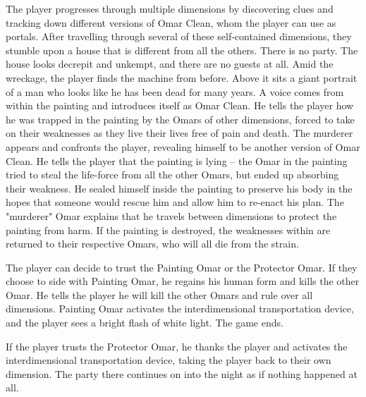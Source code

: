The player progresses through multiple dimensions by discovering clues and tracking down different versions of Omar Clean, whom the player can use as portals. After travelling through several of these self-contained dimensions, they stumble upon a house that is different from all the others. There is no party. The house looks decrepit and unkempt, and there are no guests at all. Amid the wreckage, the player finds the machine from before. Above it sits a giant portrait of a man who looks like he has been dead for many years. A voice comes from within the painting and introduces itself as Omar Clean. He tells the player how he was trapped in the painting by the Omars of other dimensions, forced to take on their weaknesses as they live their lives free of pain and death. The murderer appears and confronts the player, revealing himself to be another version of Omar Clean. He tells the player that the painting is lying -- the Omar in the painting tried to steal the life-force from all the other Omars, but ended up absorbing their weakness. He sealed himself inside the painting to preserve his body in the hopes that someone would rescue him and allow him to re-enact his plan. The "murderer" Omar explains that he travels between dimensions to protect the painting from harm. If the painting is destroyed, the weaknesses within are returned to their respective Omars, who will all die from the strain.

The player can decide to trust the Painting Omar or the Protector Omar. If they choose to side with Painting Omar, he regains his human form and kills the other Omar. He tells the player he will kill the other Omars and rule over all dimensions. Painting Omar activates the interdimensional transportation device, and the player sees a bright flash of white light. The game ends.

If the player trusts the Protector Omar, he thanks the player and activates the interdimensional transportation device, taking the player back to their own dimension. The party there continues on into the night as if nothing happened at all.